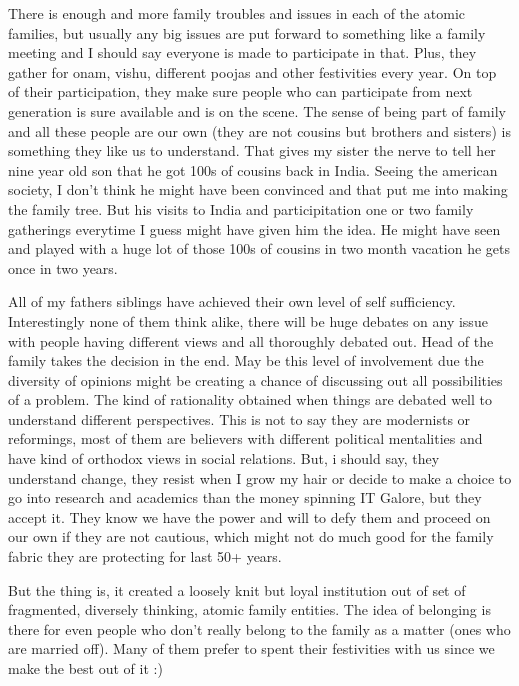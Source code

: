 There is enough and more family troubles and issues in each of the atomic families, but usually any 
big issues are put forward to something like a family meeting and I should say everyone is made 
to participate in that. Plus, they gather for onam, vishu, different poojas and other festivities 
every year. On top of their participation, they make sure people who can participate from next
generation is sure available and is on the scene. The sense of being part of family and all these 
people are our own (they are not cousins but brothers and sisters) is something they like us to
understand. That gives my sister the nerve to tell her nine year old son that he got 100s of 
cousins back in India. Seeing the american society, I don't think he might have been convinced 
and that put me into making the family tree. But his visits to India and participitation one or 
two family gatherings everytime I guess might have given him the idea. He might have seen and 
played with a huge lot of those 100s of cousins in two month vacation he gets once in two years. 

All of my fathers siblings have achieved their own level of self sufficiency. Interestingly none of 
them think alike, there will be huge debates on any issue with people having different views and all
thoroughly debated out. Head of the family takes the decision in the end. May be this level of
involvement due the diversity of opinions might be creating a chance of discussing out all 
possibilities of a problem. The kind of rationality obtained when things are debated well to 
understand different perspectives. This is not to say they are modernists or reformings, most 
of them are believers with different political mentalities and have kind of orthodox views in 
social relations. But, i should say, they understand change, they resist when I grow my hair or 
decide to make a choice to go into research and academics than the money spinning IT Galore, 
but they accept it. They know we have the power and will to defy them and proceed on our own 
if they are not cautious, which might not do much good for the family fabric they are protecting 
for last 50+ years.

But the thing is, it created a loosely knit but loyal institution out of set of fragmented, diversely
thinking, atomic family entities. The idea of belonging is there for even people who don't really 
belong to the family as a matter (ones who are married off). Many of them prefer to spent their
festivities with us since we make the best out of it :) 

